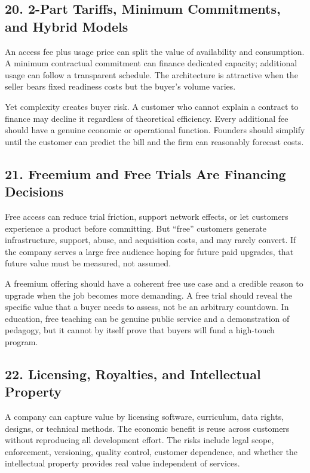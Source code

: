 \subsection*{20. 2-Part Tariffs, Minimum Commitments, and Hybrid Models}

An access fee plus usage price can split the value of availability and consumption. A minimum contractual commitment can finance dedicated capacity; additional usage can follow a transparent schedule. The architecture is attractive when the seller bears fixed readiness costs but the buyer's volume varies.

Yet complexity creates buyer risk. A customer who cannot explain a contract to finance may decline it regardless of theoretical efficiency. Every additional fee should have a genuine economic or operational function. Founders should simplify until the customer can predict the bill and the firm can reasonably forecast costs.

\subsection*{21. Freemium and Free Trials Are Financing Decisions}

Free access can reduce trial friction, support network effects, or let customers experience a product before committing. But ``free'' customers generate infrastructure, support, abuse, and acquisition costs, and may rarely convert. If the company serves a large free audience hoping for future paid upgrades, that future value must be measured, not assumed.

A freemium offering should have a coherent free use case and a credible reason to upgrade when the job becomes more demanding. A free trial should reveal the specific value that a buyer needs to assess, not be an arbitrary countdown. In education, free teaching can be genuine public service and a demonstration of pedagogy, but it cannot by itself prove that buyers will fund a high-touch program.

\subsection*{22. Licensing, Royalties, and Intellectual Property}

A company can capture value by licensing software, curriculum, data rights, designs, or technical methods. The economic benefit is reuse across customers without reproducing all development effort. The risks include legal scope, enforcement, versioning, quality control, customer dependence, and whether the intellectual property provides real value independent of services.

